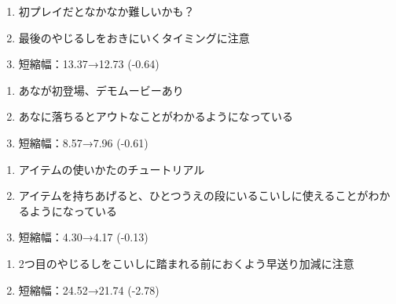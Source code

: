 \begin{enumerate}[label={\sarrow}]
\item 初プレイだとなかなか難しいかも？
\item 最後のやじるしをおきにいくタイミングに注意
\item 短縮幅：13.37→12.73 (-0.64)
\end{enumerate}



\begin{enumerate}[label={\sarrow}]
\item あなが初登場、デモムービーあり
\item あなに落ちるとアウトなことがわかるようになっている
\item 短縮幅：8.57→7.96 (-0.61)
\end{enumerate}



\clearpage
\begin{enumerate}[label={\sarrow}]
\item アイテムの使いかたのチュートリアル
\item アイテムを持ちあげると、ひとつうえの段にいるこいしに使えることがわかるようになっている
\item 短縮幅：4.30→4.17 (-0.13)
\end{enumerate}



\begin{enumerate}[label={\sarrow}]
\item 2つ目のやじるしをこいしに踏まれる前におくよう早送り加減に注意
\item 短縮幅：24.52→21.74 (-2.78)
\end{enumerate}



